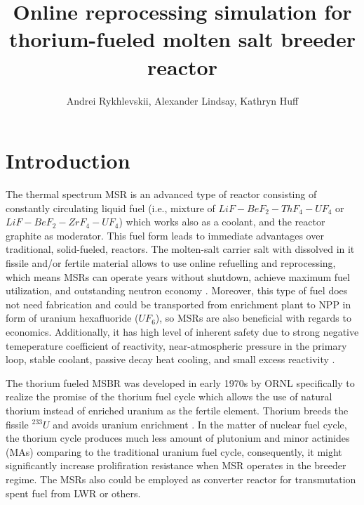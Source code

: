 \documentclass{anstrans}
\title{Online reprocessing simulation for thorium-fueled molten salt breeder reactor}
\author{Andrei Rykhlevskii, Alexander Lindsay, Kathryn Huff}
\institute{
Department of Nuclear, Plasma, and Radiological Engineering, University of Illinois at Urbana-Champaign \break
Urbana, IL
}
\begin{document}
\section{Introduction}
The thermal spectrum \gls{MSR} is an advanced type of reactor consisting of constantly circulating liquid fuel (i.e., mixture of $LiF-BeF_2-ThF_4-UF_4$ or $LiF-BeF_2-ZrF_4-UF_4$) which works also as a coolant, and the reactor graphite as moderator. This fuel form leads to immediate advantages over traditional, solid-fueled, reactors. The molten-salt carrier salt with dissolved in it fissile and/or fertile material allows to use online refuelling and reprocessing, which means \gls{MSR}s can operate years without shutdown, achieve maximum fuel utilization, and outstanding neutron economy \cite{leblanc_molten_2010}. Moreover, this type of fuel does not need fabrication and could be transported from enrichment plant to \gls{NPP} in form of uranium hexafluoride ($UF_6$), so \gls{MSR}s are also beneficial with regards to economics. Additionally, it has high level of inherent safety due to strong negative temeperature coefficient of reactivity, near-atmospheric pressure in the primary loop, stable coolant, passive decay heat cooling, and small excess reactivity \cite{elsheikh_safety_2013}.

The thorium fueled \gls{MSBR} was developed in early 1970s by \gls{ORNL} specifically to realize the promise of the thorium fuel cycle which allows the use of natural thorium instead of enriched uranium as the fertile element. Thorium breeds the fissile $^{233}U$ and avoids uranium enrichment \cite{robertson_conceptual_1971}. In the matter of nuclear fuel cycle, the thorium cycle produces much less amount of plutonium and minor actinides (MAs) comparing to the traditional uranium fuel cycle, consequently, it might significantly increase prolifiration resistance when \gls{MSR} operates in the breeder regime. The \gls{MSR}s also could be employed as converter reactor for transmutation spent fuel from \gls{LWR} or others.
\end{document}
